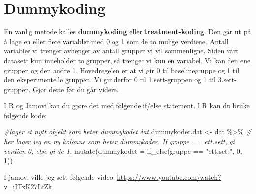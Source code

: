 \documentclass[
]{book}
\newenvironment{Shaded}{\begin{snugshade}}{\end{snugshade}}
\newcommand{\AttributeTok}[1]{\textcolor[rgb]{0.77,0.63,0.00}{#1}}
\newcommand{\CommentTok}[1]{\textcolor[rgb]{0.56,0.35,0.01}{\textit{#1}}}
\newcommand{\DecValTok}[1]{\textcolor[rgb]{0.00,0.00,0.81}{#1}}
\newcommand{\FunctionTok}[1]{\textcolor[rgb]{0.00,0.00,0.00}{#1}}
\newcommand{\NormalTok}[1]{#1}
\newcommand{\OtherTok}[1]{\textcolor[rgb]{0.56,0.35,0.01}{#1}}
\newcommand{\SpecialCharTok}[1]{\textcolor[rgb]{0.00,0.00,0.00}{#1}}
\newcommand{\StringTok}[1]{\textcolor[rgb]{0.31,0.60,0.02}{#1}}
\begin{document}
\hypertarget{dummykoding}{%
\section{Dummykoding}\label{dummykoding}}

En vanlig metode kalles \textbf{dummykoding} eller \textbf{treatment-koding}. Den går ut på å lage en eller flere variabler med 0 og 1 som de to mulige verdiene. Antall variabler vi trenger avhenger av antall grupper vi vil sammenligne. Siden vårt datasett kun inneholder to grupper, så trenger vi kun en variabel. Vi kan den ene gruppen og den andre 1. Hovedregelen er at vi gir 0 til baselinegruppe og 1 til den eksperimentelle gruppen. Vi gir derfor 0 til 1.sett-gruppen og 1 til 3.sett-gruppen. Gjør dette før du går videre.

I R og Jamovi kan du gjøre det med følgende if/else statement. I R kan du bruke følgende kode:

\begin{Shaded}
\begin{Highlighting}[]
\CommentTok{\#lager et nytt objekt som heter dummykodet.dat}
\NormalTok{dummykodet.dat }\OtherTok{\textless{}{-}}\NormalTok{ dat }\SpecialCharTok{\%\textgreater{}\%}
  \CommentTok{\# her lager jeg en ny kolonne som heter dummykoder. If gruppe == \textquotesingle{}ett.sett\textquotesingle{}, gi verdien 0, else gi de 1.}
  \FunctionTok{mutate}\NormalTok{(}\AttributeTok{dummykodet =} \FunctionTok{if\_else}\NormalTok{(gruppe }\SpecialCharTok{==} \StringTok{"ett.sett"}\NormalTok{, }\DecValTok{0}\NormalTok{, }\DecValTok{1}\NormalTok{))}
\end{Highlighting}
\end{Shaded}

I jamovi ville jeg sett følgende video: \url{https://www.youtube.com/watch?v=iITxK27LfZk}
\end{document}
